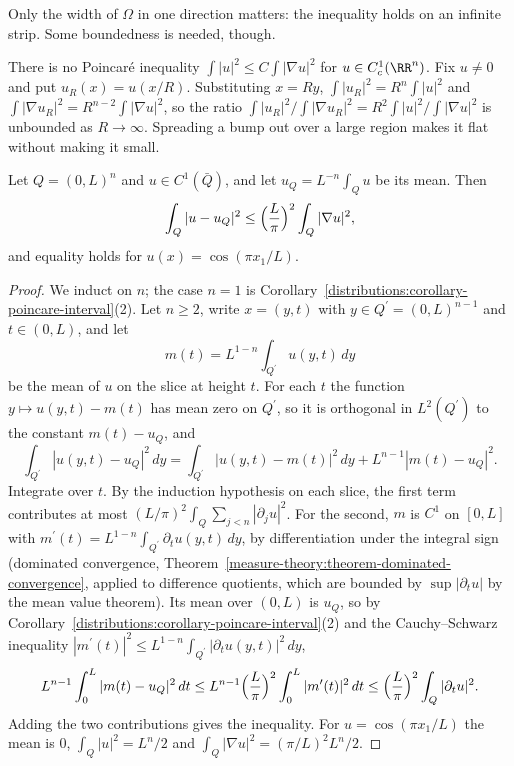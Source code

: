 Only the width of $\Omega$ in one direction matters: the inequality holds on an infinite strip. Some boundedness is needed, though.

\begin{counterexample}\label{distributions:counterexample-poincare-unbounded}
There is no Poincar\'e inequality $\int|u|^2 \leq C\int|\nabla u|^2$ for $u \in C^1_c(\RR^n)$. Fix $u \neq 0$ and put $u_R(x) = u(x/R)$. Substituting $x = Ry$,
$\int|u_R|^2 = R^n\int|u|^2$ and $\int|\nabla u_R|^2 = R^{n-2}\int|\nabla u|^2$, so the ratio $\int|u_R|^2/\int|\nabla u_R|^2 = R^2\int|u|^2/\int|\nabla u|^2$ is unbounded as $R \to \infty$. Spreading a bump
out over a large region makes it flat without making it small.
\end{counterexample}

\begin{theorem}\label{distributions:theorem-poincare-cube}
Let $Q = (0, L)^n$ and $u \in C^1(\bar Q)$, and let $u_Q = L^{-n}\int_Qu$ be its mean. Then
\[
\int_Q|u - u_Q|^2 \leq \Bigl(\frac{L}{\pi}\Bigr)^2\int_Q|\nabla u|^2,
\]
and equality holds for $u(x) = \cos(\pi x_1/L)$.
\end{theorem}

\begin{proof}
We induct on $n$; the case $n = 1$ is Corollary~\ref{distributions:corollary-poincare-interval}(2). Let $n \geq 2$, write $x = (y, t)$ with $y \in Q^{\prime} = (0, L)^{n-1}$ and $t \in (0, L)$, and let
\[
m(t) = L^{1-n}\int_{Q^{\prime}}u(y, t)\,dy
\]
be the mean of $u$ on the slice at height $t$. For each $t$ the function $y \mapsto u(y, t) - m(t)$ has mean zero on $Q^{\prime}$, so it is orthogonal in $L^2(Q^{\prime})$ to the constant $m(t) - u_Q$, and
\[
\int_{Q^{\prime}}|u(y, t) - u_Q|^2\,dy = \int_{Q^{\prime}}|u(y, t) - m(t)|^2\,dy + L^{n-1}|m(t) - u_Q|^2 .
\]
Integrate over $t$. By the induction hypothesis on each slice, the first term contributes at most $(L/\pi)^2\int_Q\sum_{j < n}|\partial_ju|^2$. For the second, $m$ is $C^1$ on $[0, L]$ with
$m^{\prime}(t) = L^{1-n}\int_{Q^{\prime}}\partial_tu(y, t)\,dy$, by differentiation under the integral sign (dominated convergence, Theorem~\ref{measure-theory:theorem-dominated-convergence}, applied to difference
quotients, which are bounded by $\sup|\partial_tu|$ by the mean value theorem). Its mean over $(0, L)$ is $u_Q$, so by Corollary~\ref{distributions:corollary-poincare-interval}(2) and the
Cauchy--Schwarz inequality $|m^{\prime}(t)|^2 \leq L^{1-n}\int_{Q^{\prime}}|\partial_tu(y, t)|^2\,dy$,
\[
L^{n-1}\int_0^L|m(t) - u_Q|^2\,dt \leq L^{n-1}\Bigl(\frac{L}{\pi}\Bigr)^2\int_0^L|m^{\prime}(t)|^2\,dt \leq \Bigl(\frac{L}{\pi}\Bigr)^2\int_Q|\partial_tu|^2 .
\]
Adding the two contributions gives the inequality. For $u = \cos(\pi x_1/L)$ the mean is $0$, $\int_Q|u|^2 = L^n/2$ and $\int_Q|\nabla u|^2 = (\pi/L)^2L^n/2$.
\end{proof}

